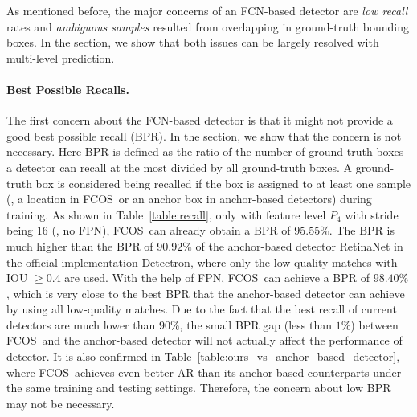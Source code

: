 \documentclass[10pt,twocolumn,letterpaper]{article}
\newcommand{\1}{{\mathbbm{1}}}           %
\def\Ours{{FCNDet}\xspace}
\def\Ours{{FCOS}\xspace}
\begin{document}
As mentioned before, the major concerns of an FCN-based detector are \emph{low recall} rates and \emph{ambiguous samples} resulted from overlapping in ground-truth bounding boxes. In the section, we show that both issues can be largely resolved with multi-level prediction.
%



\paragraph{Best Possible Recalls.} The first concern about the FCN-based detector is that it might not provide a good {best possible recall (BPR)}. In the section, we show that the concern is not necessary. Here BPR is 
defined as the ratio of the number of ground-truth boxes a detector can recall at the most divided by all ground-truth boxes. A ground-truth box is considered being recalled if the box is assigned to at least one sample (\ie, a location in \Ours\ or an anchor box in anchor-based detectors) during training.  As shown in Table~\ref{table:recall}, only with feature level $P_4$ with stride being 16 (\ie, no FPN), \Ours\ can already obtain a BPR of $95.55\%$.
%
The BPR is much higher than the BPR of $90.92\%$ of the anchor-based detector RetinaNet in the official implementation Detectron, where only the low-quality matches with IOU $\geq0.4$ are used. With the help of FPN, \Ours\ can achieve a BPR of $98.40\%$, which is very close to the best BPR that the anchor-based detector can achieve by using all low-quality matches. Due to the fact that the best recall of current detectors are much lower than $90\%$, the small BPR gap (less than $1\%$) between \Ours\ and the anchor-based detector will not actually affect the performance of detector. It is also confirmed in Table~\ref{table:ours_vs_anchor_based_detector}, where \Ours\ achieves even better AR than its anchor-based counterparts under the same training and testing settings. Therefore, the concern about low BPR may not be necessary.
\end{document}
